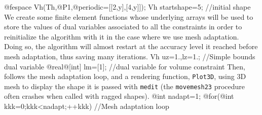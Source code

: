 \documentclass[a4paper,twoside,12pt]{book}
\begin{document}
@fespace Vh(Th,@P1,@periodic=[[2,y],[4,y]]);
Vh startshape=5; //initial shape
\eFF
We create some finite element functions whose underlying arrays will be used to store the values of dual variables associated to all the constraints in order to reinitialize the algorithm with
it in the case where we use mesh adaptation. Doing so, the algorithm will almost restart at the accuracy level it reached before mesh adaptation, thus saving many iterations.
\bFF
Vh uz=1.,lz=1.; //Simple bounds dual variable
@real@[int] lm=[1]; //dual variable for volume constraint
\eFF
Then, follows the mesh adaptation loop, and a rendering function, {\tt Plot3D},  using 3D mesh to display the shape it is passed with {\tt medit} (the {\tt movemesh23} procedure often crashes
when called with ragged shapes).
\bFF 
@int nadapt=1;
@for(@int kkk=0;kkk<nadapt;++kkk) //Mesh adaptation loop
\end{document}
